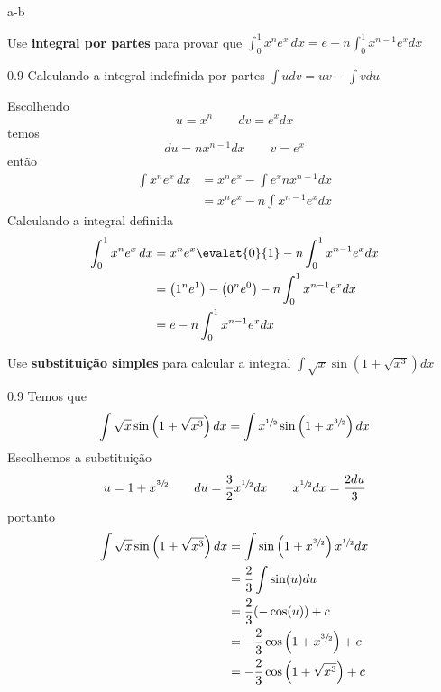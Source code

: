 \documentclass[a4paper,12pt,fleqn]{article}
\newenvironment{resposta}%
{\begingroup\color{blue}\small\begin{spacing}{0.9}}%
  {\end{spacing}\endgroup}
\begin{document}


a-b

Use \textbf{integral por partes} para provar que
\(
  \int_0^1 x^n e^x \, dx  = e - n\int_{0}^1 x^{n-1} e^x dx
\)

\begin{resposta}
  Calculando a integral indefinida por partes \(\int udv = uv - \int vdu\)

  Escolhendo
  \[
    u=x^n \qquad dv = e^xdx
  \]
  temos
  \[
    du = nx^{n-1} dx
    \qquad
    v = e^x
  \]
  então
  \begin{align*}
    \int x^n e^x \, dx
    & = x^n e^x - \int e^x nx^{n-1} dx \\
    & = x^n e^x - n\int x^{n-1} e^x dx
  \end{align*}
  Calculando a integral definida
  \begin{align*}
    \int_0^1 x^n e^x \, dx
    & = x^n e^x \evalat{0}{1}- n\int_{0}^1 x^{n-1} e^x dx \\
    & = \left(1^n e^1\right) - \left(0^n e^0\right) - n\int_{0}^1 x^{n-1} e^x dx \\
    & = e - n\int_{0}^1 x^{n-1} e^x dx
  \end{align*}
\end{resposta}


\vspace{\baselineskip}
Use \textbf{substituição simples} para calcular a integral
\(
  \int \sqrt{x} \sin\left(1+\sqrt{x^3}\right)dx
\)

\begin{resposta}
  Temos que
  \[
    \int \sqrt{x} \sin\left(1+\sqrt{x^3}\right)dx
    = \int x^{\sfrac{1}{2}} \sin\left(1+x^{\sfrac{3}{2}}\right)dx
  \]
  Escolhemos a substituição
  \[
    u = 1+x^{\sfrac{3}{2}}
    \qquad
    du = \frac{3}{2} x^{\sfrac{1}{2}} dx
    \qquad
    x^{\sfrac{1}{2}} dx = \frac{2du}{3}
  \]
  portanto
  \begin{align*}
    \int \sqrt{x} \sin\left(1+\sqrt{x^3}\right)dx
    & = \int \sin\left(1+x^{\sfrac{3}{2}}\right) x^{\sfrac{1}{2}} dx \\
    & = \frac{2}{3}\int \sin(u)du \\
    & = \frac{2}{3}(-\cos(u)) +c \\
    & = -\frac{2}{3}\cos\left(1+x^{\sfrac{3}{2}}\right) +c \\
    & = -\frac{2}{3}\cos\left(1+\sqrt{x^3}\right) + c
  \end{align*}
\end{resposta}
\end{document}
